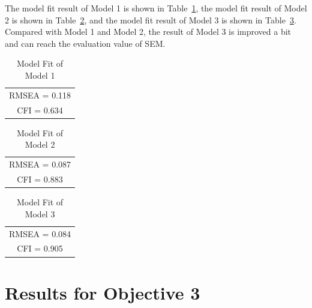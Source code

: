 The model fit result of Model 1 is shown in Table~\ref{table15}, the model fit result of Model 2 is shown in Table~\ref{table16}, and the model fit result of Model 3 is shown in Table~\ref{table23}. Compared with Model 1 and Model 2, the result of Model 3 is improved a bit and can reach the evaluation value of SEM.

\begin{table}[h]
  \caption{Model Fit of Model 1}
  \label{table15}
  \centering 
  \begin{tabular}{|c|}
  \hline
  RMSEA = 0.118 \\
  CFI = 0.634 \\
  \hline
  \end{tabular}
\end{table}

\begin{table}[h]
  \caption{Model Fit of Model 2}
  \label{table16}
  \centering 
  \begin{tabular}{|c|}
  \hline
  RMSEA = 0.087 \\
  CFI = 0.883 \\
  \hline
  \end{tabular}
\end{table}

\begin{table}[h]
\caption{Model Fit of Model 3}
\label{table23}
\centering
\begin{tabular}{|c|}
\hline
RMSEA = 0.084 \\
CFI = 0.905 \\
\hline
\end{tabular}
\end{table}


\section{Results for Objective 3}

